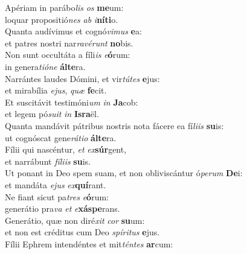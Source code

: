 \evenverse Apériam in parábo\textit{lis} \textit{os} \textbf{me}um:~\*\\
\evenverse loquar propositió\textit{nes} \textit{ab} \textit{i}\textbf{ní}\textbf{ti}o.\\
\oddverse Quanta audívimus et cognó\textit{vi}\textit{mus} \textbf{e}a:~\*\\
\oddverse et patres nostri nar\textit{ra}\textit{vé}\textit{runt} \textbf{no}bis.\\
\evenverse Non sunt occultáta a fíli\textit{is} \textit{e}\textbf{ó}rum:~\*\\
\evenverse in genera\textit{ti}\textit{ó}\textit{ne} \textbf{ál}\textbf{te}ra.\\
\oddverse Narrántes laudes Dómini, et vir\textit{tú}\textit{tes} \textbf{e}jus:~\*\\
\oddverse et mirabília \textit{e}\textit{jus}, \textit{quæ} \textbf{fe}cit.\\
\evenverse Et suscitávit testimóni\textit{um} \textit{in} \textbf{Ja}cob:~\*\\
\evenverse et legem pó\textit{su}\textit{it} \textit{in} \textbf{Is}\textbf{ra}ël.\\
\oddverse Quanta mandávit pátribus nostris nota fácere ea fí\textit{li}\textit{is} \textbf{su}is:~\*\\
\oddverse ut cognóscat gene\textit{rá}\textit{ti}\textit{o} \textbf{ál}\textbf{te}ra.\\
\evenverse Fílii qui nascéntur, \textit{et} \textit{ex}\textbf{súr}gent,~\*\\
\evenverse et narrábunt \textit{fí}\textit{li}\textit{is} \textbf{su}is.\\
\oddverse Ut ponant in Deo spem suam, et non obliviscántur ó\textit{pe}\textit{rum} \textbf{De}i:~\*\\
\oddverse et mandáta \textit{e}\textit{jus} \textit{ex}\textbf{quí}rant.\\
\evenverse Ne fiant sicut pa\textit{tres} \textit{e}\textbf{ó}rum:~\*\\
\evenverse generátio pra\textit{va} \textit{et} \textit{e}\textbf{xá}\textbf{spe}rans.\\
\oddverse Generátio, quæ non diré\textit{xit} \textit{cor} \textbf{su}um:~\*\\
\oddverse et non est créditus cum Deo \textit{spí}\textit{ri}\textit{tus} \textbf{e}jus.\\
\evenverse Fílii Ephrem intendéntes et mit\textit{tén}\textit{tes} \textbf{ar}cum:~\*\\
